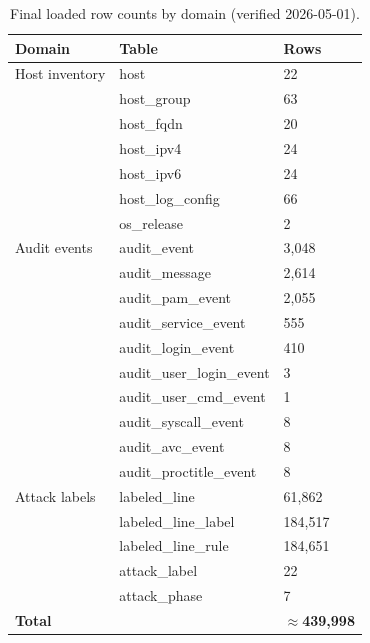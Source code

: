 \begin{table}[htbp]
\caption{Final loaded row counts by domain (verified 2026-05-01).}
\label{tab:rowcounts}
\centering
\begin{tabular}{lll}
\toprule
\textbf{Domain} & \textbf{Table} & \textbf{Rows} \\
\midrule
Host inventory   & host                       & 22       \\
                 & host\_group                & 63       \\
                 & host\_fqdn                 & 20       \\
                 & host\_ipv4                 & 24       \\
                 & host\_ipv6                 & 24       \\
                 & host\_log\_config          & 66       \\
                 & os\_release                & 2        \\
\midrule
Audit events     & audit\_event               & 3{,}048  \\
                 & audit\_message             & 2{,}614  \\
                 & audit\_pam\_event          & 2{,}055  \\
                 & audit\_service\_event      & 555      \\
                 & audit\_login\_event        & 410      \\
                 & audit\_user\_login\_event  & 3        \\
                 & audit\_user\_cmd\_event    & 1        \\
                 & audit\_syscall\_event      & 8        \\
                 & audit\_avc\_event          & 8        \\
                 & audit\_proctitle\_event    & 8        \\
\midrule
Attack labels    & labeled\_line              & 61{,}862 \\
                 & labeled\_line\_label       & 184{,}517 \\
                 & labeled\_line\_rule        & 184{,}651 \\
                 & attack\_label              & 22       \\
                 & attack\_phase              & 7        \\
\midrule
\textbf{Total}   &                            & \textbf{$\approx$439{,}998} \\
\bottomrule
\end{tabular}
\end{table}


